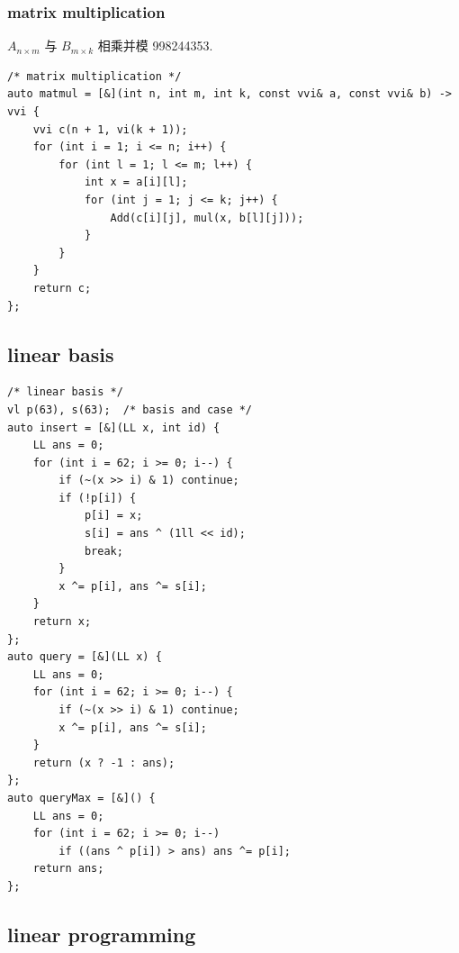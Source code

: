\documentclass[UTF8, a4paper, titlepage, twoside]{ctexart}
\begin{document}
\subsubsection*{ matrix multiplication }
\(A_{n \times m}\) 与 \(B_{m \times k}\) 相乘并模 998244353.
\begin{lstlisting}[style=cpp]
/* matrix multiplication */
auto matmul = [&](int n, int m, int k, const vvi& a, const vvi& b) -> vvi {
    vvi c(n + 1, vi(k + 1));
    for (int i = 1; i <= n; i++) {
        for (int l = 1; l <= m; l++) {
            int x = a[i][l];
            for (int j = 1; j <= k; j++) {
                Add(c[i][j], mul(x, b[l][j]));
            }
        }
    }
    return c;
};
\end{lstlisting}

\subsection{ linear basis }
\begin{lstlisting}[style=cpp]
/* linear basis */
vl p(63), s(63);  /* basis and case */
auto insert = [&](LL x, int id) {
    LL ans = 0;
    for (int i = 62; i >= 0; i--) {
        if (~(x >> i) & 1) continue;
        if (!p[i]) {
            p[i] = x;
            s[i] = ans ^ (1ll << id);
            break;
        }
        x ^= p[i], ans ^= s[i];
    }
    return x;
};
auto query = [&](LL x) {
    LL ans = 0;
    for (int i = 62; i >= 0; i--) {
        if (~(x >> i) & 1) continue;
        x ^= p[i], ans ^= s[i];
    }
    return (x ? -1 : ans);
};
auto queryMax = [&]() {
    LL ans = 0;
    for (int i = 62; i >= 0; i--)
        if ((ans ^ p[i]) > ans) ans ^= p[i];
    return ans;
};
\end{lstlisting}

\subsection{ linear programming }

\newpage
\end{document}
